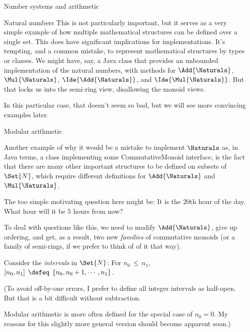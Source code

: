 \documentclass[12pt]{PalisadesLakesBook}
\begin{document}
\begin{plSection}{Number systems and arithmetic}
\begin{plSection}{Natural numbers}
This is not particularly important, but it serves as 
a very simple example
of how multiple mathematical structures can be defined
over a single set.
This does have significant implications for implementations.
It's tempting, and a common mistake, 
to represent mathematical structures by types or classes.
We might have, say, a Java class that provides an
unbounded implementation of the natural numbers,
with methods for $\Add{\Naturals}$, $\Mul{\Naturals}$, 
$\Ide{\Add{\Naturals}}$,
and $\Ide{\Mul{\Naturals}}$.
But that locks us into the semi-ring view,
disallowing the monoid views.

\TODO In this particular case, that doesn't seem so bad,
but we will see more convincing examples later.

\begin{plSection}{Modular arithmetic}

Another example of why it would be a mistake to implement
$\Naturals$ as, in Java terms,
a class implementing some {\javaFont CommutativeMonoid} interface,
is the fact that there are many other important structures
to be defined on subsets of $\Set{N}$, which require
different definitions for $\Add{\Naturals}$ and $\Mul{\Naturals}$.

The too simple motivating question here might be:
It is the $20$th hour of the day. What hour will it be $5$ hours
from now?

To deal with questions like this, we need to modify 
$\Add{\Naturals}$,
give up ordering, and get, as a result, two new \emph{families} of 
commutative monoids (or a family of semi-rings, 
if we prefer to think of of it that way).

Consider the \emph{intervals} in $\Set{N}$:
For $n_{0}\,\leq\, n_{1}$, 
$\left[ n_{0}, n_{1} \right] \; \defeq \;
\left\{ n_{0}, n_{0} + 1, \cdots , n_{1} \right\}$.

(\NOTE To avoid off-by-one errors, 
I prefer to define all integer intervals as half-open.
But that is a bit difficult without subtraction.

\NOTE Modular arithmetic is more often defined for the special 
case of $n_0=0$. My reasons for this slightly more general 
version should become apparent soon.)


\end{plSection}
\end{plSection}
\end{plSection}
\end{document}
